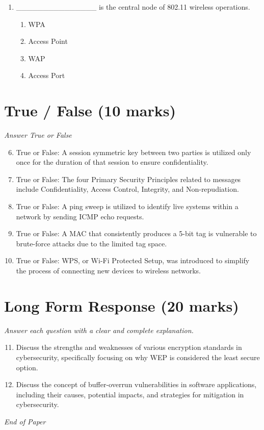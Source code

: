 \documentclass[12pt]{article}
\begin{document}
\begin{enumerate}[label=\arabic*.]
\begin{enumerate}[label=(\alph*)]
    \item Restart STP and retry the query, up to a limited number of retries.
    \item Remove a subset of the constraints and retry the query.
\end{enumerate}
\item \_\_\_\_\_\_\_\_\_\_\_\_\_\_\_ is the central node of 802.11 wireless operations.
\begin{enumerate}[label=(\alph*)]
    \item WPA
    \item Access Point
    \item WAP
    \item Access Port
\end{enumerate}
\end{enumerate}

\section*{True / False (10 marks)}
\textit{Answer True or False}
\begin{enumerate}[label=\arabic*.]
\setcounter{enumi}{5}
\item True or False: A session symmetric key between two parties is utilized only once for the duration of that session to ensure confidentiality.
\item True or False: The four Primary Security Principles related to messages include Confidentiality, Access Control, Integrity, and Non-repudiation.
\item True or False: A ping sweep is utilized to identify live systems within a network by sending ICMP echo requests.
\item True or False: A MAC that consistently produces a 5-bit tag is vulnerable to brute-force attacks due to the limited tag space.
\item True or False: WPS, or Wi-Fi Protected Setup, was introduced to simplify the process of connecting new devices to wireless networks.
\end{enumerate}

\section*{Long Form Response (20 marks)}
\textit{Answer each question with a clear and complete explanation.}
\begin{enumerate}[label=\arabic*.]
\setcounter{enumi}{10}
\item Discuss the strengths and weaknesses of various encryption standards in cybersecurity, specifically focusing on why WEP is considered the least secure option.
\item Discuss the concept of buffer-overrun vulnerabilities in software applications, including their causes, potential impacts, and strategies for mitigation in cybersecurity.
\end{enumerate}

\vfill
\noindent\textit{End of Paper}
\end{document}
